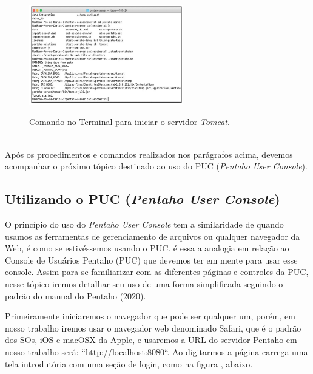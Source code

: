 \begin{figure}[H]
	\vspace*{0,2cm}
    \centering
    \caption{Comando no Terminal para iniciar o servidor \textit{Tomcat}.}
    \includegraphics[width=0.6\textwidth]{./04-figuras/figura-pserver-iniciando}
    \label{fig:ilustfigpserveriniciando}
\end{figure}
\vspace*{-0,9cm}
{\raggedright {}} \\

Ap\'{o}s os procedimentos e comandos realizados nos par\'{a}grafos acima, devemos acompanhar o pr\'{o}ximo t\'{o}pico 
destinado ao uso do PUC (\textit{Pentaho User Console}).

\subsection{Utilizando o PUC (\textit{Pentaho User Console})}

O princ\'{i}pio do uso do \textit{Pentaho User Console} tem a similaridade de quando usamos as 
ferramentas de gerenciamento de arquivos ou qualquer navegador da Web, \'{e} como se estiv\'{e}ssemos 
usando o PUC. \'{e} essa a analogia em rela\c{c}\~{a}o ao Console de Usu\'{a}rios Pentaho (PUC) que 
devemos ter em mente para usar esse console. Assim para se familiarizar com as diferentes p\'{a}ginas e 
controles da PUC, nesse t\'opico iremos detalhar seu uso de uma forma simplificada seguindo o padr\~{a}o do 
manual do Pentaho (2020).

Primeiramente iniciaremos o navegador que pode ser qualquer um, por\'{e}m, em nosso trabalho 
iremos usar o navegador web denominado Safari, que \'{e} o padr\~{a}o dos SOs, iOS e macOSX da Apple, 
e usaremos a URL do servidor Pentaho em nosso trabalho ser\'{a}: ``http://localhost:8080``.  
Ao digitarmos a p\'{a}gina carrega uma tela introdut\'oria com uma se\c{c}\~{a}o de login, como na figura , abaixo.

